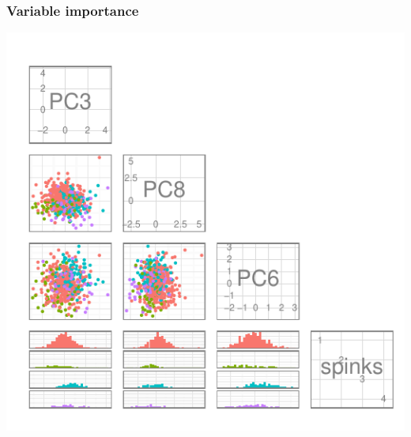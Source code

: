 \documentclass{beamer}\usepackage{graphicx, color}
\makeatletter
\def\maxwidth{ %
  \ifdim\Gin@nat@width>\linewidth
    \linewidth
  \else
    \Gin@nat@width
  \fi
}
\newenvironment{knitrout}{}{} %
\makeatother
\begin{document}
\begin{frame}[fragile]
  \frametitle{Variable importance}
\begin{knitrout}
\color{fgcolor}
\includegraphics[width=\maxwidth]{figure/imp} 

\end{knitrout}

\end{frame}
\end{document}
